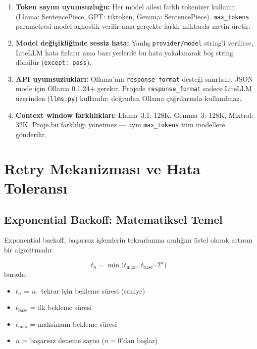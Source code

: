 \begin{enumerate}
  \item \textbf{Token say{\i}m uyumsuzlu\u{g}u:} Her model ailesi farkl{\i} tokenizer kullan{\i}r (Llama: SentencePiece, GPT: tiktoken, Gemma: SentencePiece). \texttt{max\_tokens} parametresi model-agnostik verilir ama ger\c{c}ekte farkl{\i} miktarda metin \"{u}retir.

  \item \textbf{Model de\u{g}i\c{s}ikli\u{g}inde sessiz hata:} Yanl{\i}\c{s} \texttt{provider/model} string'i verilirse, LiteLLM hata f{\i}rlat{\i}r ama baz{\i} yerlerde bu hata yakalanarak bo\c{s} string d\"{o}n\"{u}l\"{u}r (\texttt{except: pass}).

  \item \textbf{API uyumsuzluklar{\i}:} Ollama'n{\i}n \texttt{response\_format} deste\u{g}i s{\i}n{\i}rl{\i}d{\i}r. JSON mode i\c{c}in Ollama 0.1.24+ gerekir. Projede \texttt{response\_format} sadece LiteLLM \"{u}zerinden (\texttt{llms.py}) kullan{\i}l{\i}r; do\u{g}rudan Ollama \c{c}a\u{g}r{\i}lar{\i}nda kullan{\i}lmaz.

  \item \textbf{Context window farkl{\i}l{\i}klar{\i}:} Llama~3.1: 128K, Gemma~3: 128K, Mixtral: 32K. Proje bu farkl{\i}l{\i}\u{g}{\i} y\"{o}netmez --- ayn{\i} \texttt{max\_tokens} t\"{u}m modellere g\"{o}nderilir.
\end{enumerate}


\section{Retry Mekanizmas{\i} ve Hata Tolerans{\i}}
\label{sec:retry}

\subsection{Exponential Backoff: Matematiksel Temel}
\label{sec:llm-exp-backoff}

Exponential backoff, ba\c{s}ar{\i}s{\i}z i\c{s}lemlerin tekrarlanma aral{\i}\u{g}{\i}n{\i} \"{u}stel olarak art{\i}ran bir algoritmad{\i}r.

\begin{formulbox}
\begin{equation}
t_n = \min\bigl(t_{\max},\; t_{\text{base}} \cdot 2^n\bigr)
\label{eq:llm-exp-backoff}
\end{equation}
burada:
\begin{itemize}[leftmargin=1.5em]
  \item $t_n$ = $n$.~tekrar i\c{c}in bekleme s\"{u}resi (saniye)
  \item $t_{\text{base}}$ = ilk bekleme s\"{u}resi
  \item $t_{\max}$ = maksimum bekleme s\"{u}resi
  \item $n$ = ba\c{s}ar{\i}s{\i}z deneme say{\i}s{\i} ($n = 0$'dan ba\c{s}lar)
\end{itemize}
\end{formulbox}

